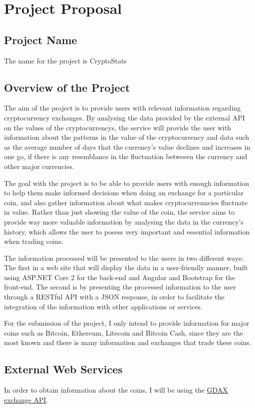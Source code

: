 \chapter{Project Proposal}
\section{Project Name}
The name for the project is CryptoStats
\section{Overview of the Project}
The aim of the project is to provide users with relevant information regarding cryptocurrency exchanges. By analysing the data provided by the external API on the values of the cryptocurrencys, the service will provide the user with information about the patterns in the value of the cryptocurrency and data such as the average number of days that the currency's value declines and increases in one go, if there is any resemblance in the fluctuation betweeen the currency and other major currencies.

The goal with the project is to be able to provide users with enough information to help them make informed decisions when doing an exchange for a particular coin, and also gather information about what makes cryptocurrenncies fluctuate in value. Rather than just showing the value of the coin, the service aims to provide way more valuable information by analysing the data in the currency's history, which allows the user to posess very important and essential information when trading coins.

The information processed will be presented to the users in two different ways: The first in a web site that will display the data in a user-friendly manner, built using ASP.NET Core 2 for the back-end and Angular and Bootstrap for the front-end. The second is by presenting the processed information to the user through a RESTful API with a JSON response, in order to facilitate the integration of the information with other applications or services.

For the submission of the project, I only intend to provide information for major coins such as Bitcoin, Ethereum, Litecoin and Bitcoin Cash, since they are the most known and there is many information and exchanges that trade these coins.
\section{External Web Services}
In order to obtain information about the coins, I will be using the \href{https://docs.gdax.com}{GDAX exchange API}.



